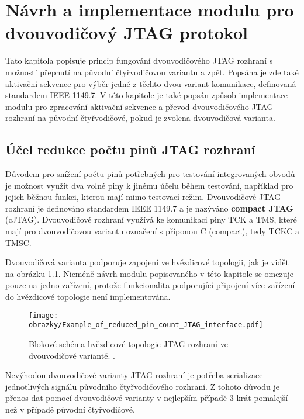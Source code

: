 
\chapter{Návrh a implementace modulu pro dvouvodičový \acs{JTAG} protokol}
Tato kapitola popisuje princip fungování dvouvodičového \acs{JTAG} rozhraní s možností přepnutí na původní čtyřvodičovou variantu a zpět. Popsána je zde také aktivační sekvence pro výběr jedné z těchto dvou variant komunikace, definovaná standardem IEEE 1149.7. V této kapitole je také popsán způsob implementace modulu pro zpracování aktivační sekvence a převod dvouvodičového \acs{JTAG} rozhraní na původní čtyřvodičové, pokud je zvolena dvouvodičová varianta.
	
\section{Účel redukce počtu pinů \acs{JTAG} rozhraní}	\label{sec:2w_interface}
Důvodem pro snížení počtu pinů potřebných pro testování integrovaných obvodů je možnost využít dva volné piny k jinému účelu během testování, například pro jejich běžnou funkci, kterou mají mimo testovací režim. Dvouvodičové \acs{JTAG} rozhraní je definováno standardem IEEE 1149.7 a je nazýváno \textbf{compact \acs{JTAG}} (c\acs{JTAG}). Dvouvodičové rozhraní využívá ke komunikaci piny \acs{TCK} a \acs{TMS}, které mají pro dvouvodičovou variantu označení s příponou C (compact), tedy \acs{TCKC} a \acs{TMSC}. \cite{IEEE_1149-7} \cite{JTAG}

Dvouvodičová varianta podporuje zapojení ve hvězdicové topologii, jak je vidět na obrázku \ref{fig:star2_sch}. Nicméně návrh modulu popisovaného v této kapitole se omezuje pouze na jedno zařízení, protože funkcionalita podporující připojení více zařízení do hvězdicové topologie není implementována.

\begin{figure}[!h]
  \begin{center}
    \texttt{[image: obrazky/Example\_of\_reduced\_pin\_count\_JTAG\_interface.pdf]}
  \end{center}
  \caption{Blokové schéma hvězdicové topologie \acs{JTAG} rozhraní ve dvouvodičové variantě. \cite{JTAG}.}
	\label{fig:star2_sch}
\end{figure}

Nevýhodou dvouvodičové varianty \acs{JTAG} rozhraní je potřeba serializace jednotlivých signálu původního čtyřvodičového rozhraní. Z tohoto důvodu je přenos dat pomocí dvouvodičové varianty v nejlepším případě 3-krát pomalejší než v případě původní čtyřvodičové. \cite{IEEE_1149-7}
